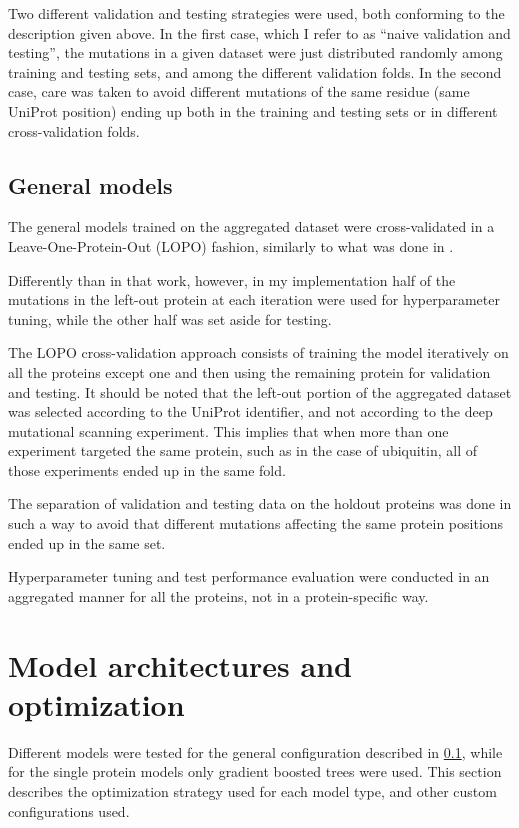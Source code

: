 Two different validation and testing strategies were used, both conforming to the description given above.
In the first case, which I refer to as ``naive validation and testing'', the mutations in a given dataset were just distributed randomly among training and testing sets, and among the different validation folds.
In the second case, care was taken to avoid different mutations of the same residue (same UniProt position) ending up both in the training and testing sets or in different cross-validation folds.

\subsection{General models}\label{sec:mm_general_models}
The general models trained on the aggregated dataset were cross-validated in a Leave-One-Protein-Out (LOPO) fashion, similarly to what was done in \textcite{Gray2018}.

Differently than in that work, however, in my implementation half of the mutations in the left-out protein at each iteration were used for hyperparameter tuning, while the other half was set aside for testing.

The LOPO cross-validation approach consists of training the model iteratively on all the proteins except one and then using the remaining protein for validation and testing.
It should be noted that the left-out portion of the aggregated dataset was selected according to the UniProt identifier, and not according to the deep mutational scanning experiment.
This implies that when more than one experiment targeted the same protein, such as in the case of ubiquitin, all of those experiments ended up in the same fold.

The separation of validation and testing data on the holdout proteins was done in such a way to avoid that different mutations affecting the same protein positions ended up in the same set.

Hyperparameter tuning and test performance evaluation were conducted in an aggregated manner for all the proteins, not in a protein-specific way.

\section{Model architectures and optimization}\label{sec:mm_optimization}
Different models were tested for the general configuration described in \cref{sec:mm_general_models}, while for the single protein models only gradient boosted trees were used.
This section describes the optimization strategy used for each model type, and other custom configurations used.


